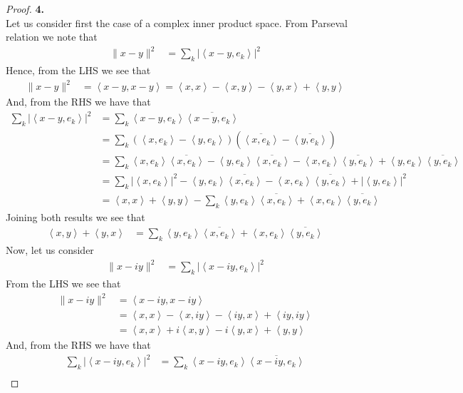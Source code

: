 \documentclass[11pt]{article}
\newcommand{\inprd}[1]{\left\langle{#1}\right\rangle}
\theoremstyle{definition}
\begin{document}
\cleardoublepage
\begin{proof}{\textbf{4.}}\\
Let us consider first the case of a complex inner product space.
From Parseval relation we note that
\begin{align*} \|x - y\|^2 &= \sum_{k} |\inprd{x - y, e_k}|^2 \end{align*}
Hence, from the LHS we see that
\begin{align*} 
    \|x - y\|^2 &= \inprd{x - y, x - y}
    = \inprd{x, x} - \inprd{x,y} - \inprd{y, x} + \inprd{y,y}
\end{align*}
And, from the RHS we have that
\begin{align*}
    \sum_{k} |\inprd{x - y, e_k}|^2
    &= \sum_{k} \inprd{x - y, e_k}\overline{\inprd{x - y, e_k}}\\
    &= \sum_{k} (\inprd{x, e_k}-\inprd{y, e_k})(\overline{\inprd{x, e_k}} - \overline{\inprd{y,e_k}})\\
    &= \sum_{k} \inprd{x, e_k}\overline{\inprd{x, e_k}} - \inprd{y, e_k}\overline{\inprd{x, e_k}} - \inprd{x, e_k}\overline{\inprd{y,e_k}} + \inprd{y, e_k}\overline{\inprd{y,e_k}}\\
    &= \sum_{k} |\inprd{x, e_k}|^2 - \inprd{y, e_k}\overline{\inprd{x, e_k}} - \inprd{x, e_k}\overline{\inprd{y,e_k}} + |\inprd{y, e_k}|^2\\
    &= \inprd{x,x} + \inprd{y,y} -\sum_{k} \inprd{y, e_k}\overline{\inprd{x, e_k}} + \inprd{x, e_k}\overline{\inprd{y,e_k}}
\end{align*}
Joining both results we see that
\begin{align*}
    \inprd{x,y} + \inprd{y, x}
    &= \sum_{k} \inprd{y, e_k}\overline{\inprd{x, e_k}} + \inprd{x, e_k}\overline{\inprd{y,e_k}}
\end{align*}
Now, let us consider
\begin{align*}
    \|x - iy\|^2 &= \sum_{k} |\inprd{x - iy, e_k}|^2
\end{align*}
From the LHS we see that
\begin{align*}
    \|x - iy\|^2 &= \inprd{x - iy, x - iy}\\
    &= \inprd{x , x} - \inprd{x,iy} - \inprd{iy, x} + \inprd{iy, iy}\\
    &= \inprd{x , x} + i\inprd{x, y} - i\inprd{y, x} + \inprd{y, y}
\end{align*}
And, from the RHS we have that
\begin{align*}
    \sum_{k} |\inprd{x - iy, e_k}|^2
    &= \sum_{k} \inprd{x - iy, e_k}\overline{\inprd{x - iy, e_k}}\\

\end{align*}
\end{proof}
\end{document}
